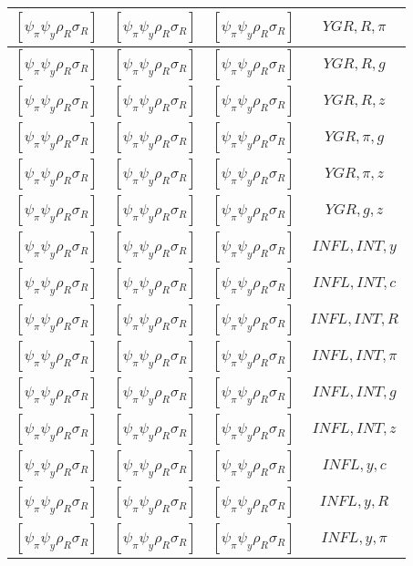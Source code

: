 \documentclass[a4paper,10pt]{article}
\begin{document}
\begin{longtable}{|c|c|c|c|}
\hline
$[\psi_\pi \psi_y \rho_R \sigma_R ]$ & $[\psi_\pi \psi_y \rho_R \sigma_R ]$ & $[\psi_\pi \psi_y \rho_R \sigma_R ]$ & ${YGR},{R},{\pi}$ \\
\hline
$[\psi_\pi \psi_y \rho_R \sigma_R ]$ & $[\psi_\pi \psi_y \rho_R \sigma_R ]$ & $[\psi_\pi \psi_y \rho_R \sigma_R ]$ & ${YGR},{R},{g}$ \\
\hline
$[\psi_\pi \psi_y \rho_R \sigma_R ]$ & $[\psi_\pi \psi_y \rho_R \sigma_R ]$ & $[\psi_\pi \psi_y \rho_R \sigma_R ]$ & ${YGR},{R},{z}$ \\
\hline
$[\psi_\pi \psi_y \rho_R \sigma_R ]$ & $[\psi_\pi \psi_y \rho_R \sigma_R ]$ & $[\psi_\pi \psi_y \rho_R \sigma_R ]$ & ${YGR},{\pi},{g}$ \\
\hline
$[\psi_\pi \psi_y \rho_R \sigma_R ]$ & $[\psi_\pi \psi_y \rho_R \sigma_R ]$ & $[\psi_\pi \psi_y \rho_R \sigma_R ]$ & ${YGR},{\pi},{z}$ \\
\hline
$[\psi_\pi \psi_y \rho_R \sigma_R ]$ & $[\psi_\pi \psi_y \rho_R \sigma_R ]$ & $[\psi_\pi \psi_y \rho_R \sigma_R ]$ & ${YGR},{g},{z}$ \\
\hline
$[\psi_\pi \psi_y \rho_R \sigma_R ]$ & $[\psi_\pi \psi_y \rho_R \sigma_R ]$ & $[\psi_\pi \psi_y \rho_R \sigma_R ]$ & ${INFL},{INT},{y}$ \\
\hline
$[\psi_\pi \psi_y \rho_R \sigma_R ]$ & $[\psi_\pi \psi_y \rho_R \sigma_R ]$ & $[\psi_\pi \psi_y \rho_R \sigma_R ]$ & ${INFL},{INT},{c}$ \\
\hline
$[\psi_\pi \psi_y \rho_R \sigma_R ]$ & $[\psi_\pi \psi_y \rho_R \sigma_R ]$ & $[\psi_\pi \psi_y \rho_R \sigma_R ]$ & ${INFL},{INT},{R}$ \\
\hline
$[\psi_\pi \psi_y \rho_R \sigma_R ]$ & $[\psi_\pi \psi_y \rho_R \sigma_R ]$ & $[\psi_\pi \psi_y \rho_R \sigma_R ]$ & ${INFL},{INT},{\pi}$ \\
\hline
$[\psi_\pi \psi_y \rho_R \sigma_R ]$ & $[\psi_\pi \psi_y \rho_R \sigma_R ]$ & $[\psi_\pi \psi_y \rho_R \sigma_R ]$ & ${INFL},{INT},{g}$ \\
\hline
$[\psi_\pi \psi_y \rho_R \sigma_R ]$ & $[\psi_\pi \psi_y \rho_R \sigma_R ]$ & $[\psi_\pi \psi_y \rho_R \sigma_R ]$ & ${INFL},{INT},{z}$ \\
\hline
$[\psi_\pi \psi_y \rho_R \sigma_R ]$ & $[\psi_\pi \psi_y \rho_R \sigma_R ]$ & $[\psi_\pi \psi_y \rho_R \sigma_R ]$ & ${INFL},{y},{c}$ \\
\hline
$[\psi_\pi \psi_y \rho_R \sigma_R ]$ & $[\psi_\pi \psi_y \rho_R \sigma_R ]$ & $[\psi_\pi \psi_y \rho_R \sigma_R ]$ & ${INFL},{y},{R}$ \\
\hline
$[\psi_\pi \psi_y \rho_R \sigma_R ]$ & $[\psi_\pi \psi_y \rho_R \sigma_R ]$ & $[\psi_\pi \psi_y \rho_R \sigma_R ]$ & ${INFL},{y},{\pi}$ \\

\end{longtable}
\end{document}
